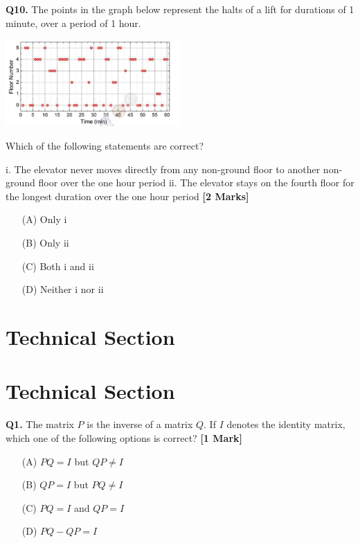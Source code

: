 \documentclass[11pt]{article}
\newcommand{\questiona}[2]{
    \noindent\textbf{Q#2.} #1 \hfill \textbf{[1 Mark]}
}
\newcommand{\questionb}[2]{
    \noindent\textbf{Q#2.} #1 \hfill \textbf{[2 Marks]}
}
\begin{document}
\vspace{0.5cm}

\questionb{The points in the graph below represent the halts of a lift for durations of 1 minute, over a period of 1 hour.

\begin{center}
\includegraphics[width=0.5\textwidth]{figures/10.png}
\end{center}

Which of the following statements are correct?

i. The elevator never moves directly from any non-ground floor to another non-ground floor over the one hour period
ii. The elevator stays on the fourth floor for the longest duration over the one hour period}{10}
\begin{enumerate}
    \item[(A)] Only i
    \item[(B)] Only ii
    \item[(C)] Both i and ii
    \item[(D)] Neither i nor ii
\end{enumerate}

\vspace{0.8cm}

\section*{Technical Section}

\section*{Technical Section}

\questiona{The matrix \( P \) is the inverse of a matrix \( Q \). If \( I \) denotes the identity matrix, which one of the following options is correct?}{1}
\begin{enumerate}
    \item[(A)] \( PQ = I \) but \( QP \neq I \)
    \item[(B)] \( QP = I \) but \( PQ \neq I \)
    \item[(C)] \( PQ = I \) and \( QP = I \)
    \item[(D)] \( PQ - QP = I \)
\end{enumerate}
\end{document}
